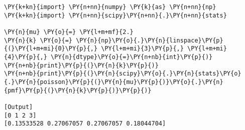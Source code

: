 \begin{Verbatim}[label=\makebox{\href{https://bitbucket.org/lbaldini/statnotes/src/master/snippets/scipy.stats.poisson.py}{https://bitbucket.org/.../scipy.stats.poisson.py}},commandchars=\\\{\}]
\PY{k+kn}{import} \PY{n+nn}{numpy} \PY{k}{as} \PY{n+nn}{np}
\PY{k+kn}{import} \PY{n+nn}{scipy}\PY{n+nn}{.}\PY{n+nn}{stats}

\PY{n}{mu} \PY{o}{=} \PY{l+m+mf}{2.}
\PY{n}{k} \PY{o}{=} \PY{n}{np}\PY{o}{.}\PY{n}{linspace}\PY{p}{(}\PY{l+m+mi}{0}\PY{p}{,} \PY{l+m+mi}{3}\PY{p}{,} \PY{l+m+mi}{4}\PY{p}{,} \PY{n}{dtype}\PY{o}{=}\PY{n+nb}{int}\PY{p}{)}
\PY{n+nb}{print}\PY{p}{(}\PY{n}{k}\PY{p}{)}
\PY{n+nb}{print}\PY{p}{(}\PY{n}{scipy}\PY{o}{.}\PY{n}{stats}\PY{o}{.}\PY{n}{poisson}\PY{p}{(}\PY{n}{mu}\PY{p}{)}\PY{o}{.}\PY{n}{pmf}\PY{p}{(}\PY{n}{k}\PY{p}{)}\PY{p}{)}

[Output]
[0 1 2 3]
[0.13533528 0.27067057 0.27067057 0.18044704]
\end{Verbatim}